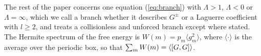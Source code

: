 The rest of the paper concerns one equation (\ref{eq:branch}) with $\Lambda>1$, $\Lambda<0$ or $\Lambda=\infty$, which we call a branch whether it describes $G^\pm$ or a Laguerre coefficient with $l\ge2$, and treats a collisionless and unforced branch except where stated. The Hermite spectrum of the free energy is $W(m)=p_m\langle g_m^2\rangle$, where $\langle\cdot\rangle$ is the average over the periodic box, so that $\sum_mW(m)=\langle[G,G]\rangle$.
